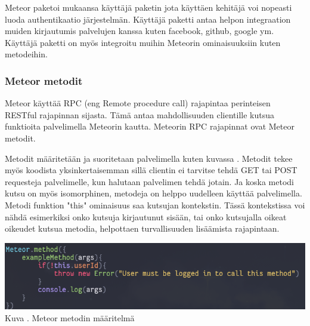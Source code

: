 \documentclass[11pt,a4paper,titlepage,oneside]{article}
\begin{document}
Meteor paketoi mukaansa käyttäjä paketin jota käyttäen kehitäjä voi nopeasti luoda authentikaatio järjestelmän.
Käyttäjä paketti antaa helpon integraation muiden kirjautumis palvelujen kanssa kuten facebook, github, google ym. 
Käyttäjä paketti on myös integroitu muihin Meteorin ominaisuuksiin kuten metodeihin.



\subsubsection{Meteor metodit}





Meteor käyttää RPC (eng Remote procedure call) rajapintaa  perinteisen RESTful rajapinnan sijasta. %
Tämä antaa mahdollisuuden clientille kutsua funktioita palvelimella Meteorin kautta.
Meteorin RPC rajapinnat ovat Meteor metodit.
\medskip


Metodit määritetään ja suoritetaan palvelimella kuten kuvassa \nextImageCount.
Metodit tekee myös koodista yksinkertaisemman sillä clientin ei tarvitse tehdä GET tai POST requesteja palvelimelle, kun halutaan palvelimen tehdä jotain. 
Ja koska metodi kutsu on myös isomorphinen, metodeja on helppo uudelleen käyttää palvelimella.
Metodi funktion "this"{} ominaisuus saa kutsujan kontekstin. 
Tässä kontekstissa voi nähdä esimerkiksi onko kutsuja kirjautunut sisään, tai onko kutsujalla oikeat oikeudet kutsua metodia, 
helpottaen turvallisuuden lisäämista rajapintaan.
\bigskip

\includegraphics[width=15cm]{src/public/methodexample.png}\\
Kuva \getImgCount {}. Meteor metodin määritelmä
\medskip
\end{document}
